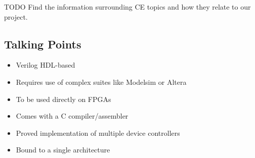 TODO Find the information surrounding CE topics and how they relate to our project. 

\subsection{Talking Points}

\begin{itemize}
\item Verilog HDL-based
\item Requires use of complex suites like Modelsim or Altera
\item To be used directly on FPGAs
\item Comes with a C compiler/assembler
\item Proved implementation of multiple device controllers
\item Bound to a single architecture
\end{itemize}


